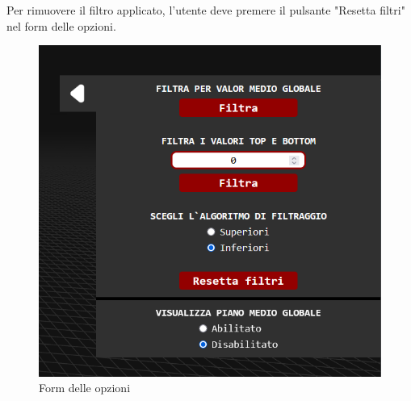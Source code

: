 Per rimuovere il filtro applicato, l'utente deve premere il pulsante "Resetta filtri" nel form delle opzioni.
\begin{figure}[H]
    \centering
    \includegraphics[scale=0.6]{template/images/options.png}
    \caption{Form delle opzioni}
\end{figure}

